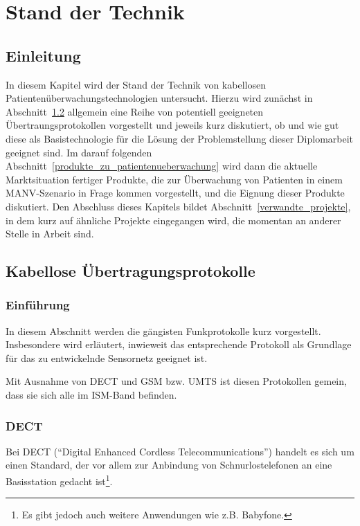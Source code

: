
\chapter{Stand der Technik}\label{Stand der Technik}

\section{Einleitung}
In diesem Kapitel wird der Stand der Technik von kabellosen Patientenüberwachungstechnologien untersucht. 
Hierzu wird zunächst in Abschnitt~\ref{kabellose_uebertragungsprotokolle} allgemein eine Reihe von potentiell
geeigneten Übertraungsprotokollen vorgestellt und jeweils kurz diskutiert, ob und wie gut diese als 
Basistechnologie für die Lösung der Problemstellung dieser Diplomarbeit geeignet sind. Im darauf folgenden
Abschnitt~\ref{produkte_zu_patientenueberwachung} wird dann die aktuelle Marktsituation fertiger Produkte,
die zur Überwachung von Patienten in einem MANV-Szenario in Frage kommen vorgestellt, und die Eignung dieser
Produkte diskutiert. Den Abschluss dieses Kapitels bildet Abschnitt~\ref{verwandte_projekte}, in dem
kurz auf ähnliche Projekte eingegangen wird, die momentan an anderer Stelle in Arbeit sind.

\section{Kabellose Übertragungsprotokolle}\label{kabellose_uebertragungsprotokolle}
    \subsection{Einführung}
        In diesem Abschnitt werden die gängisten Funkprotokolle kurz vorgestellt. Insbesondere wird erläutert,
        inwieweit das entsprechende Protokoll als Grundlage für das zu entwickelnde Sensornetz geeignet ist.

        Mit Ausnahme von DECT und GSM bzw. UMTS ist diesen Protokollen gemein, dass sie sich alle im ISM-Band 
        befinden. 

    \subsection{DECT}
        Bei DECT ("`Digital Enhanced Cordless Telecommunications"') handelt es sich um einen Standard, 
        der vor allem zur Anbindung von Schnurlostelefonen an eine Basisstation gedacht ist\footnote{Es gibt
        jedoch auch weitere Anwendungen wie z.B. Babyfone.}. 

